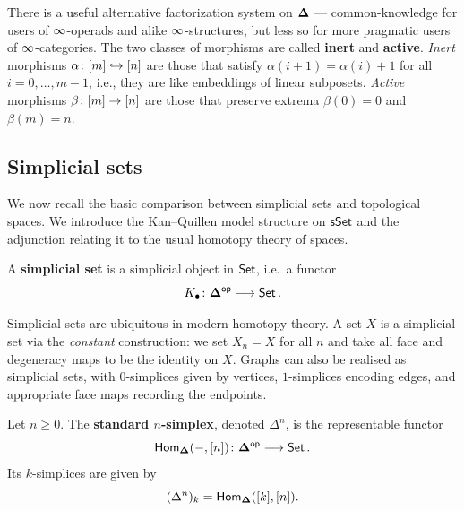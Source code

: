 \begin{remark}\label{ch2:: rmk: inert active}
    There is a useful alternative factorization system on $\mathbf\Delta$ — common-knowledge for users of $\operatorname{\infty}$-operads and alike $\operatorname{\infty}$-structures, but less so for more pragmatic users of $\operatorname{\infty}$-categories. The two classes of morphisms are called \textbf{inert} and \textbf{active}. \emph{Inert} morphisms $\alpha \colon [m] \hookrightarrow [n]$ are those that satisfy $\alpha(i+1) = \alpha(i) + 1$ for all $i = 0,\ldots, m-1$, i.e., they are like embeddings of linear subposets. \emph{Active} morphisms $\beta \colon [m] \rightarrow [n]$ are those that preserve extrema $\beta(0) = 0$ and $\beta(m) = n$.
\end{remark}


\subsection{Simplicial sets}

We now recall the basic comparison between simplicial sets and topological spaces. We introduce the Kan--Quillen model structure on $\operatorname{\sf sSet}$ and the adjunction relating it to the usual homotopy theory of spaces.

\begin{definition}\label{ch2:: def: simplicial set}
    A \textbf{simplicial set} is a simplicial object in $\operatorname{{\mathsf{Set}}}$, i.e.\ a functor
    \begin{equation}
        K_\bullet\colon \mathbf\Delta^{\mathsf{op}} \longrightarrow \operatorname{{\mathsf{Set}}}.
    \end{equation} 
\end{definition}

Simplicial sets are ubiquitous in modern homotopy theory. A set $X$ is a simplicial set via the \emph{constant} construction: we set $X_n = X$ for all $n$ and take all face and degeneracy maps to be the identity on $X$. Graphs can also be realised as simplicial sets, with $0$-simplices given by vertices, $1$-simplices encoding edges, and appropriate face maps recording the endpoints.

\begin{definition}\label{ch2:: def: standard simplex}
    Let $n\geq 0$. The \textbf{standard $n$-simplex}, denoted $\Delta^{n}$, is the representable functor
    \begin{equation}
        \operatorname{\sf Hom}_{\mathbf\Delta}(-, [n])\colon \mathbf\Delta^{\mathsf{op}} \longrightarrow \operatorname{{\mathsf{Set}}}.
    \end{equation} 
    Its $k$-simplices are given by 
    \begin{equation}
        (\Delta^{n})_k = \operatorname{\sf Hom}_{\mathbf\Delta}([k],[n]).
    \end{equation}
\end{definition}

